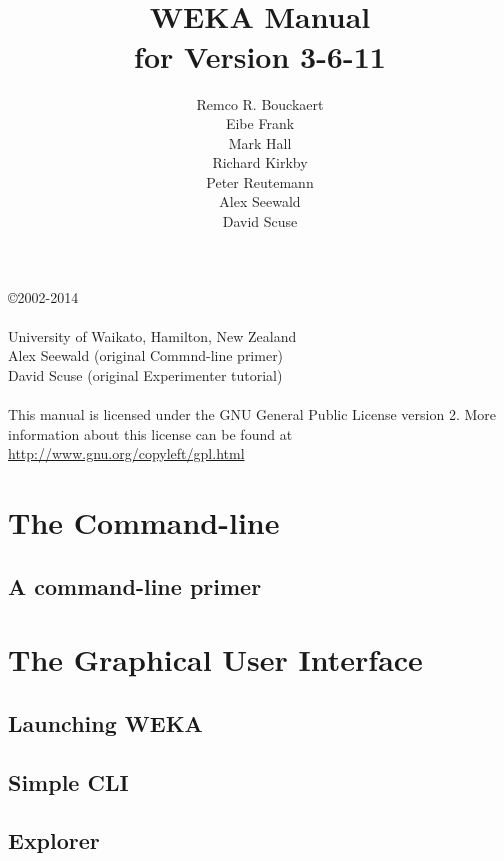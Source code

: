 \documentclass[a4paper]{book}
\title{\epsfig{file=images/coat_of_arms.eps,width=10cm}\vspace{3cm}\\WEKA Manual\\for Version 3-6-11}
\author{Remco R. Bouckaert\\Eibe Frank\\Mark Hall\\Richard Kirkby\\Peter Reutemann\\Alex Seewald\\David Scuse}
\begin{document}
\begin{titlepage}
\maketitle
\thispagestyle{empty}
\center
\begin{table}[b]
\copyright 2002-2014 \\
 \\
University of Waikato, Hamilton, New Zealand \\
Alex Seewald (original Commnd-line primer) \\
David Scuse (original Experimenter tutorial) \\
\\
This manual is licensed under the GNU General Public License version 2. More information about this license can be found at \url{http://www.gnu.org/copyleft/gpl.html}
\end{table}

\end{titlepage}

\tableofcontents

\part{The Command-line}

\chapter{A command-line primer}


\part{The Graphical User Interface}

\chapter{Launching WEKA}


\chapter{Simple CLI}


\chapter{Explorer}

\end{document}
